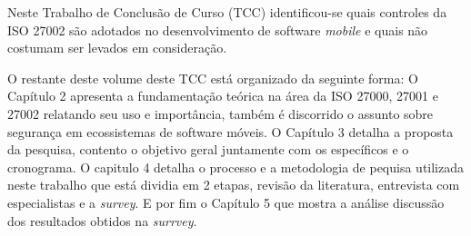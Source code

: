 
Neste Trabalho de Conclusão de Curso (TCC) identificou-se quais controles da ISO 27002 são adotados no desenvolvimento de software \textit{mobile} e quais não costumam ser levados em consideração.


O restante deste volume deste TCC está organizado da seguinte forma: O Capítulo 2 apresenta a fundamentação teórica na área da ISO 27000, 27001 e 27002 relatando seu uso e importância, também é discorrido o assunto sobre segurança em ecossistemas de software móveis. O Capítulo 3 detalha a proposta da pesquisa, contento o objetivo geral juntamente com os específicos e o cronograma. O capitulo 4 detalha o processo e a metodologia de pequisa utilizada neste trabalho que está dividia em 2 etapas, revisão da literatura, entrevista com especialistas e a \textit{survey}. E por fim o Capítulo 5 que mostra a análise discussão dos resultados obtidos na \textit{surrvey}.








 
